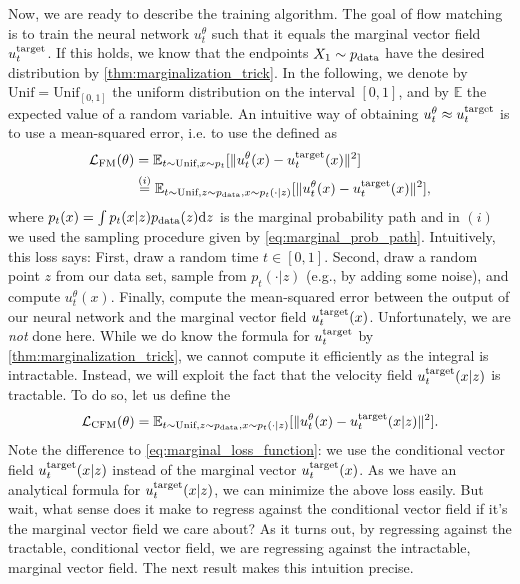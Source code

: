 Now, we are ready to describe the training algorithm. The goal of flow matching is to train the neural network $u_t^\theta$ such that it equals the marginal vector field $u^{\text{target}}_t$. If this holds, we know that the endpoints $X_1\sim p_{\rm{data}}$ have the desired distribution by \cref{thm:marginalization_trick}. In the following, we denote by $\text{Unif}=\text{Unif}_{[0,1]}$ the uniform distribution on the interval $[0,1]$, and by $\mathbb{E}$ the expected value of a random variable. An intuitive way of obtaining $u_t^\theta\approx u^{\text{target}}_t$ is to use a mean-squared error, i.e. to use the  defined as
\label{subsec:training_algorithm}
\begin{align}
    \label{eq:marginal_loss_function}
\mathcal{L}_{\text{FM}}(\theta)&=\mathbb{E}_{t\sim\text{Unif},x\sim p_t}[\|u_t^\theta(x) - u^{\text{target}}_t(x)\|^2]\\&\overset{(i)}{=} \mathbb{E}_{t\sim\text{Unif},z\sim p_{\rm{data}}, x\sim p_t(\cdot|z)}[\|u_t^\theta(x) - u^{\text{target}}_t(x)\|^2],
\end{align}
where $p_t(x)=\int p_t(x|z)p_{\rm{data}}(z) \mathrm{d} z$ is the marginal probability path and in $(i)$ we used the sampling procedure given by \cref{eq:marginal_prob_path}. Intuitively, this loss says: First, draw a random time $t \in [0,1]$. Second, draw a random point $z$ from our data set, sample from $p_t(\cdot|z)$ (e.g., by adding some noise), and compute $u_t^\theta(x)$. Finally, compute the mean-squared error between the output of our neural network and the marginal vector field $u^{\text{target}}_t(x)$. Unfortunately, we are \textit{not} done here. While we do know the formula for $u^{\text{target}}_t$ by \cref{thm:marginalization_trick}, we cannot compute it efficiently as the integral is intractable. Instead, we will exploit the fact that the  velocity field $u^{\text{target}}_t(x|z)$ is tractable. %
To do so, let us define the  
\begin{align}
\label{eq:cfm}
\mathcal{L}_{\text{CFM}}(\theta) =     \mathbb{E}_{t\sim \text{Unif}, z\sim p_{\rm{data}}, x\sim p_t(\cdot|z)}[\|u_t^\theta(x) - u^{\text{target}}_t(x|z)\|^2].
\end{align}
Note the difference to     \cref{eq:marginal_loss_function}: we use the conditional vector field $u^{\text{target}}_t(x|z)$ instead of the marginal vector $u^{\text{target}}_t(x)$. As we have an analytical formula for $u^{\text{target}}_t(x|z)$, we can minimize the above loss easily. But wait, what sense does it make to regress against the conditional vector field if it's the marginal vector field we care about? As it turns out, by  regressing against the tractable, conditional vector field, we are  regressing against the intractable, marginal vector field. The next result makes this intuition precise.

